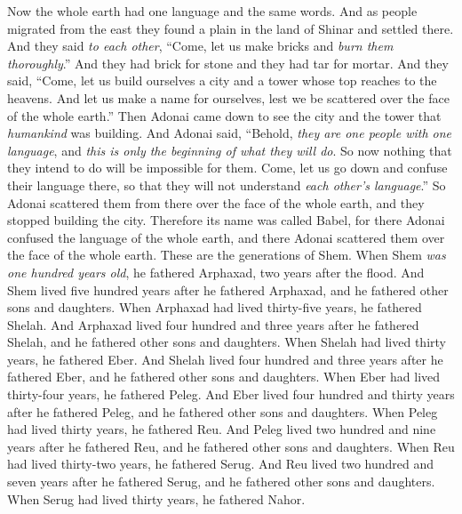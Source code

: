 \begin{biblechapter} %
 Now the whole earth had one language and the same words.
\verse And as people migrated from the east they found a plain in the land of Shinar and settled there.
\verse And they said \textit{to each other}, “Come, let us make bricks and \textit{burn them thoroughly}.” And they had brick for stone and they had tar for mortar.
\verse And they said, “Come, let us build ourselves a city and a tower whose top reaches to the heavens. And let us make a name for ourselves, lest we be scattered over the face of the whole earth.”
\verse Then Adonai came down to see the city and the tower that \textit{humankind} was building.
\verse And Adonai said, “Behold, \textit{they are one people with one language}, and \textit{this is only the beginning of what they will do}. So now nothing that they intend to do will be impossible for them.
\verse Come, let us go down and confuse their language there, so that they will not understand \textit{each other’s language}.”
\verse So Adonai scattered them from there over the face of the whole earth, and they stopped building the city.
\verse Therefore its name was called Babel, for there Adonai confused the language of the whole earth, and there Adonai scattered them over the face of the whole earth.
 These are the generations of Shem. When Shem \textit{was one hundred years old}, he fathered Arphaxad, two years after the flood.
\verse And Shem lived five hundred years after he fathered Arphaxad, and he fathered other sons and daughters.
\verse When Arphaxad had lived thirty-five years, he fathered Shelah.
\verse And Arphaxad lived four hundred and three years after he fathered Shelah, and he fathered other sons and daughters.
\verse When Shelah had lived thirty years, he fathered Eber.
\verse And Shelah lived four hundred and three years after he fathered Eber, and he fathered other sons and daughters.
\verse When Eber had lived thirty-four years, he fathered Peleg.
\verse And Eber lived four hundred and thirty years after he fathered Peleg, and he fathered other sons and daughters.
\verse When Peleg had lived thirty years, he fathered Reu.
\verse And Peleg lived two hundred and nine years after he fathered Reu, and he fathered other sons and daughters.
\verse When Reu had lived thirty-two years, he fathered Serug.
\verse And Reu lived two hundred and seven years after he fathered Serug, and he fathered other sons and daughters.
\verse When Serug had lived thirty years, he fathered Nahor.

\end{biblechapter}
